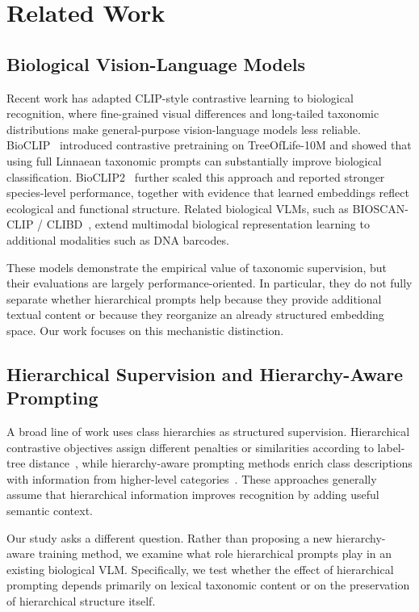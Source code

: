 \section{Related Work}

\subsection{Biological Vision-Language Models}

Recent work has adapted CLIP-style contrastive learning to biological recognition, where fine-grained visual differences and long-tailed taxonomic distributions make general-purpose vision-language models less reliable. BioCLIP~\cite{stevens2024bioclip} introduced contrastive pretraining on TreeOfLife-10M and showed that using full Linnaean taxonomic prompts can substantially improve biological classification. BioCLIP2~\cite{gu2025bioclip2} further scaled this approach and reported stronger species-level performance, together with evidence that learned embeddings reflect ecological and functional structure. Related biological VLMs, such as BIOSCAN-CLIP / CLIBD~\cite{gong2024bioscan}, extend multimodal biological representation learning to additional modalities such as DNA barcodes.

These models demonstrate the empirical value of taxonomic supervision, but their evaluations are largely performance-oriented. In particular, they do not fully separate whether hierarchical prompts help because they provide additional textual content or because they reorganize an already structured embedding space. Our work focuses on this mechanistic distinction.

\subsection{Hierarchical Supervision and Hierarchy-Aware Prompting}

A broad line of work uses class hierarchies as structured supervision. Hierarchical contrastive objectives assign different penalties or similarities according to label-tree distance~\cite{zhang2022usealllabels,kokilepersaud2024taxes}, while hierarchy-aware prompting methods enrich class descriptions with information from higher-level categories~\cite{novack2023chils,liang2024haprompts}. These approaches generally assume that hierarchical information improves recognition by adding useful semantic context.

Our study asks a different question. Rather than proposing a new hierarchy-aware training method, we examine what role hierarchical prompts play in an existing biological VLM. Specifically, we test whether the effect of hierarchical prompting depends primarily on lexical taxonomic content or on the preservation of hierarchical structure itself.

